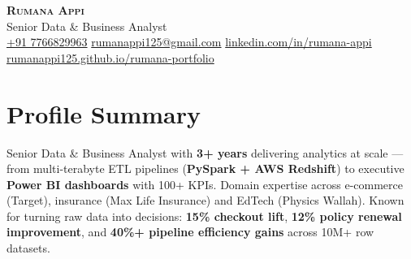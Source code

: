 \documentclass[letterpaper,11pt]{article}
\begin{document}
\begin{center}
    {\Huge \scshape \textbf{Rumana Appi}} \\ \vspace{3pt}
    {\large \color{accent} Senior Data \& Business Analyst} \\ \vspace{4pt}
    \small
     \href{tel:+917766829963}{+91 7766829963} \quad
     \href{mailto:rumanappi125@gmail.com}{rumanappi125@gmail.com} \quad
     \href{https://www.linkedin.com/in/rumana-appi/}{linkedin.com/in/rumana-appi} \quad
     \href{https://rumanappi125.github.io/rumana-portfolio/}{rumanappi125.github.io/rumana-portfolio}
\end{center}

\section{Profile Summary}
Senior Data \& Business Analyst with \textbf{3+ years} delivering analytics at scale — from multi-terabyte ETL pipelines (\textbf{PySpark + AWS Redshift}) to executive \textbf{Power BI dashboards} with 100+ KPIs. Domain expertise across e-commerce (Target), insurance (Max Life Insurance) and EdTech (Physics Wallah). Known for turning raw data into decisions: \textbf{15\% checkout lift}, \textbf{12\% policy renewal improvement}, and \textbf{40\%+ pipeline efficiency gains} across 10M+ row datasets.

\end{document}
